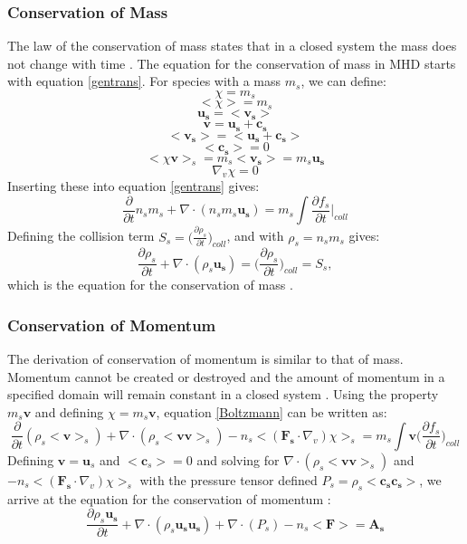 \subsubsection{Conservation of Mass}
The law of the conservation of mass states that in a closed system the mass does
not change with time \citep{ConOfMass}. The equation for the conservation of
mass in MHD starts with equation \ref{gentrans}. For species with a mass $m_s$,
we can define:
\[ \chi = m_s \]
\[< \chi > = m_s\]
\[\mathbf{u_s} = < \mathbf{v_s} >\]
\[ \mathbf{v} = \mathbf{u_s} + \mathbf{c_s} \]
\[ < \mathbf{v_s} > = < \mathbf{u_s} + \mathbf{c_s} > \]
\[ < \mathbf{c_s} > = 0 \]
\[ < \chi\mathbf{v} >_s = m_s < \mathbf{v_s} > =  m_s \mathbf{u_s} \]
\[ \nabla_v \chi = 0 \]
Inserting these into equation \ref{gentrans} gives:
\begin{equation}
\frac{\partial}{\partial t} n_s m_s + \nabla \cdot (n_s m_s \mathbf{u_s}) = m_s
\int \frac{\partial f_s}{\partial t} \bigg|_{coll}
\label{ConOfMass-1}
\end{equation}
Defining the collision term $ S_s = \big( \frac{\partial \rho_s}{\partial t}
\big)_{coll}$, and with $\rho_s = n_s m_s$ gives:
\begin{equation}
\frac{\partial \rho_s}{\partial t} + \nabla \cdot (\rho_s \mathbf{u_s})
=  \bigg( \frac{\partial \rho_s}{\partial t} \bigg)_{coll} = S_s,
\label{ConOfMass}
\end{equation}
which is the equation for the conservation of mass \citep{Kominsky}.
\subsubsection{Conservation of Momentum}
The derivation of conservation of momentum is similar to that of mass.
Momentum cannot be created or destroyed and the amount of momentum in a specified
domain will remain constant in a closed system \citep{ConOfMomen}. Using
the property $m_s \mathbf{v}$ and defining $\chi = m_s \mathbf{v}$, equation
\ref{Boltzmann} can be written as:
\begin{equation}
\frac{\partial}{\partial t}(\rho_s < \mathbf{v} >_s) + \nabla \cdot (\rho_s <
\mathbf{v}\mathbf{v} >_s ) - n_s < (\mathbf{F_s} \cdot \nabla_v) \chi >_s = m_s
\int \mathbf{v} \bigg( \frac{\partial f_s}{\partial t} \bigg)_{coll}
\label{}
\end{equation}
Defining $\mathbf{v} = \mathbf{u}_s$ and $< \mathbf{c}_s >=0$ and solving for
$\nabla \cdot (\rho_s < \mathbf{vv} >_s)$ and $-n_s < (\mathbf{F_s} \cdot
\nabla_v) \chi >_s$ with the pressure tensor defined $P_s = \rho_s <
\mathbf{c_s c_s} >$, we arrive at the equation for the conservation of momentum \citep{Kominsky}:
\begin{equation}
\frac{\partial \rho_s \mathbf{u_s}}{\partial t} + \nabla \cdot
(\rho_s\mathbf{u_s u_s}) + \nabla \cdot (P_s) - n_s < \mathbf{F} > =
\mathbf{A_s}
\label{ConOfMomen}
\end{equation}
